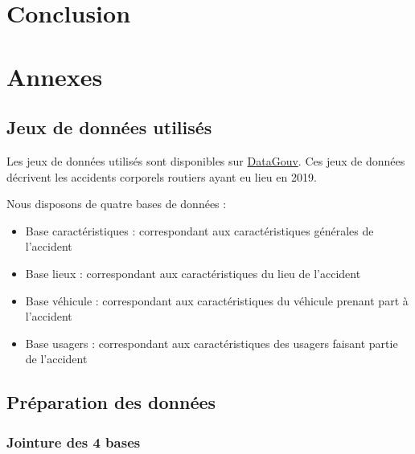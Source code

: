\documentclass[french,]{tp}
\providecommand{\tightlist}{%
  \setlength{\itemsep}{0pt}\setlength{\parskip}{0pt}}
\begin{document}
\newpage

\hypertarget{conclusion}{%
\section{Conclusion}\label{conclusion}}

\newpage

\hypertarget{appendix-annexes}{%
\appendix}


\hypertarget{annexes}{%
\section{Annexes}\label{annexes}}

\hypertarget{jeux-donnees}{%
\subsection{Jeux de données utilisés}\label{jeux-donnees}}

Les jeux de données utilisés sont disponibles sur \href{https://www.data.gouv.fr/fr/datasets/bases-de-donnees-annuelles-des-accidents-corporels-de-la-circulation-routiere-annees-de-2005-a-2019/}{DataGouv}. Ces jeux de données décrivent les accidents corporels routiers ayant eu lieu en 2019.

Nous disposons de quatre bases de données :

\begin{itemize}
\tightlist
\item
  Base caractéristiques : correspondant aux caractéristiques générales de l'accident
\item
  Base lieux : correspondant aux caractéristiques du lieu de l'accident
\item
  Base véhicule : correspondant aux caractéristiques du véhicule prenant part à l'accident
\item
  Base usagers : correspondant aux caractéristiques des usagers faisant partie de l'accident
\end{itemize}

\hypertarget{prepa-donnees}{%
\subsection{Préparation des données}\label{prepa-donnees}}

\hypertarget{jointure-des-4-bases}{%
\subsubsection{Jointure des 4 bases}\label{jointure-des-4-bases}}
\end{document}
